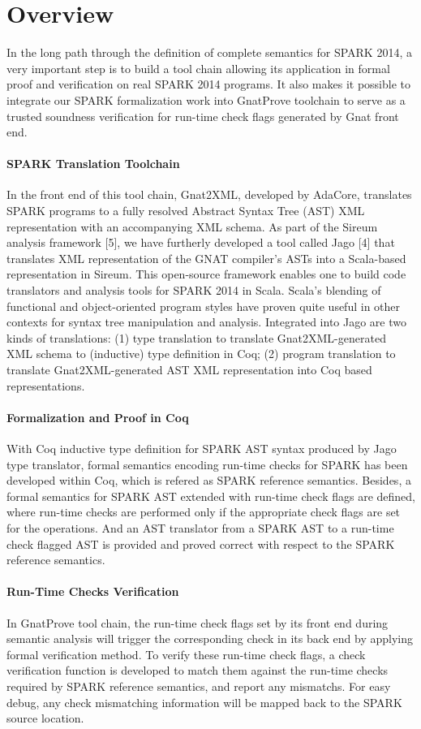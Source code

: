 \section{Overview}
In the long path through the definition of complete semantics for SPARK 2014, a
very important step is to build a tool chain allowing its application in formal
proof and verification on real SPARK 2014 programs. It also makes it possible to
integrate our SPARK formalization work into GnatProve toolchain to serve as
a trusted soundness verification for run-time check flags generated by Gnat
front end.

\paragraph{SPARK Translation Toolchain}
In the front end of this tool chain, Gnat2XML, developed by AdaCore, translates
SPARK programs to a fully resolved Abstract Syntax Tree (AST) XML representation
with an accompanying XML schema. As part of the Sireum analysis framework [5],
we have furtherly developed a tool called Jago [4] that translates XML
representation of the GNAT compiler's ASTs into a Scala-based representation in
Sireum. This open-source framework enables one to build code translators and
analysis tools for SPARK 2014 in Scala. Scala’s blending of functional and
object-oriented program styles have proven quite useful in other contexts for
syntax tree manipulation and analysis. Integrated into Jago are two kinds of
translations: (1) type translation to translate Gnat2XML-generated XML schema to
(inductive) type definition in Coq; (2) program translation to translate
Gnat2XML-generated AST XML representation into Coq based representations.

\paragraph{Formalization and Proof in Coq}
With Coq inductive type definition for SPARK AST syntax produced by Jago type
translator, formal semantics encoding run-time checks for SPARK has
been developed within Coq, which is refered as SPARK reference semantics.
Besides, a formal semantics for SPARK AST extended with run-time check flags
are defined, where run-time checks are performed only if the appropriate check
flags are set for the operations. And an AST translator from a SPARK AST to a
run-time check flagged AST is provided and proved correct with respect to the
SPARK reference semantics.

\paragraph{Run-Time Checks Verification}
In GnatProve tool chain, the run-time check flags set by its front end during
semantic analysis will trigger the corresponding check in its back end by
applying formal verification method. To verify these run-time check flags, a
check verification function is developed to match them against the
run-time checks required by SPARK reference semantics, and report any mismatchs.
For easy debug, any check mismatching information will be mapped back to the
SPARK source location.



